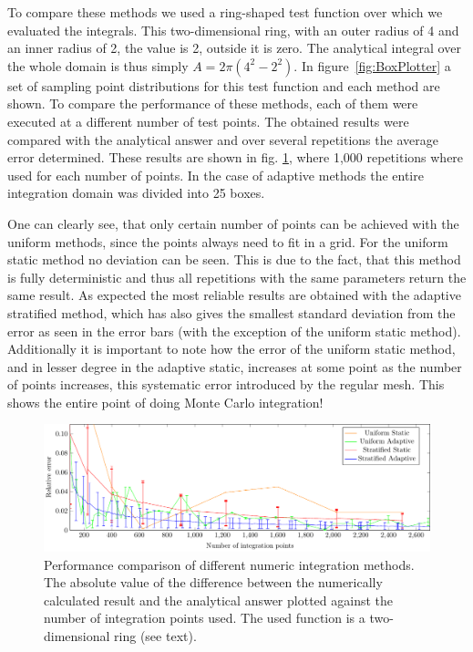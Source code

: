 To compare these methods we used a ring-shaped test function over which we evaluated the integrals. This two-dimensional ring, with an outer radius of 4 and an inner radius of 2, the value is 2, outside it is zero. The analytical integral over the whole domain is thus simply $ A=2\pi (4^2-2^2)$.  In figure~\ref{fig:BoxPlotter} a set of sampling point distributions for this test function and each method are shown. To compare the performance of these methods, each of them were executed at a different number of test points. The obtained results were compared with the analytical answer and over several repetitions the average error determined. These results are shown in fig. \ref{fig:MCerrs}, where 1,000 repetitions where used for each number of points. In the case of adaptive methods the entire integration domain was divided into 25 boxes.

One can clearly see, that only certain number of points can be achieved with the uniform methods, since the points always need to fit in a grid. For the uniform static method no deviation can be seen. This is due to the fact, that this method is fully deterministic and thus all repetitions with the same parameters return the same result.
As expected the most reliable results are obtained with the adaptive stratified method, which has also gives the smallest standard deviation from the error as seen in the error bars (with the exception of the uniform static method).
Additionally it is important to note how the error of the uniform static method, and in lesser degree in the adaptive static, increases at some point as the number of points increases, this systematic error introduced by the regular mesh. This shows the entire point of doing Monte Carlo integration!
\begin{figure}[th]
  \begin{center}
  \includegraphics[scale=0.9]{graphs/integration_test_ring.pdf}
  \caption{Performance comparison of different numeric integration methods. The absolute value of the difference between the numerically calculated result and the analytical answer plotted against the number of integration points used. The used function is a two-dimensional ring (see text).}
  \label{fig:MCerrs}
  \end{center}
\end{figure}
